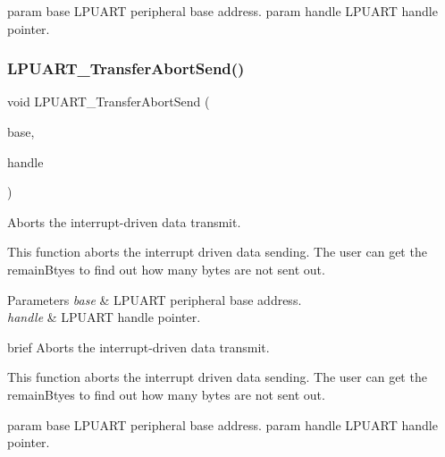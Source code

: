 param base L\+P\+U\+A\+RT peripheral base address. param handle L\+P\+U\+A\+RT handle pointer. \mbox{\label{group__lpuart__driver_ga6dfe9efe9656e126c70ee79fa03f2be3}} 
\subsubsection{\texorpdfstring{LPUART\_TransferAbortSend()}{LPUART\_TransferAbortSend()}}
{\footnotesize\ttfamily void L\+P\+U\+A\+R\+T\+\_\+\+Transfer\+Abort\+Send (\begin{DoxyParamCaption}\item[{\mbox{\hyperlink{struct_l_p_u_a_r_t___type}{L\+P\+U\+A\+R\+T\+\_\+\+Type}} $\ast$}]{base,  }\item[{\mbox{\hyperlink{struct__lpuart__handle}{lpuart\+\_\+handle\+\_\+t}} $\ast$}]{handle }\end{DoxyParamCaption})}



Aborts the interrupt-\/driven data transmit. 

This function aborts the interrupt driven data sending. The user can get the remain\+Btyes to find out how many bytes are not sent out.


\begin{DoxyParams}{Parameters}
{\em base} & L\+P\+U\+A\+RT peripheral base address. \\
\hline
{\em handle} & L\+P\+U\+A\+RT handle pointer.\\
\hline
\end{DoxyParams}
brief Aborts the interrupt-\/driven data transmit.

This function aborts the interrupt driven data sending. The user can get the remain\+Btyes to find out how many bytes are not sent out.

param base L\+P\+U\+A\+RT peripheral base address. param handle L\+P\+U\+A\+RT handle pointer. \mbox{\label{group__lpuart__driver_ga10eae12610523a624c1016882f8dba5f}} 
